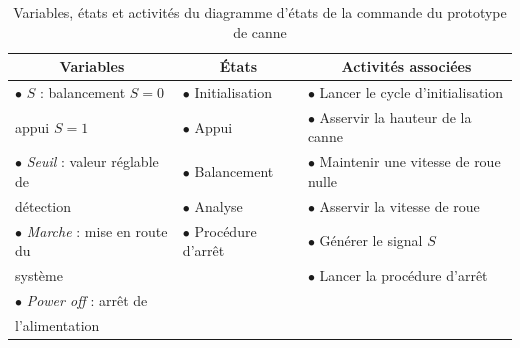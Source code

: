 \begin{table}[!ht]
\centering
 \begin{tabular}{|l|l|l|}
  \hline
  \multicolumn{1}{|c|}{\textbf{Variables}} & \multicolumn{1}{|c|}{\textbf{États}} & \multicolumn{1}{|c|}{\textbf{Activités associées}}  \\ 
  \hline
  $\bullet$ $S$ : balancement $S = 0$ & $\bullet$ Initialisation & $\bullet$ Lancer le cycle d'initialisation \\ 
  
  \hspace{0.8cm} appui $S = 1$ & $\bullet$ Appui & $\bullet$ Asservir la hauteur de la canne \\ 
  
  $\bullet$ {\it{Seuil}} : valeur réglable de & $\bullet$ Balancement & $\bullet$ Maintenir une vitesse de roue nulle \\ 
  
  \hspace{1.2cm} détection & $\bullet$ Analyse & $\bullet$ Asservir la vitesse de roue \\ 
  
  $\bullet$ {\it{Marche}} : mise en route du & $\bullet$ Procédure d'arrêt & $\bullet$ Générer le signal $S$ \\ 
  
  \hspace{1.5cm} système  &  &  $\bullet$ Lancer la procédure d'arrêt \\ 
  
 $\bullet$  {\it{Power off}} : arrêt de  &  &  \\ 
  
  \hspace{1.8cm} l'alimentation &  &  \\
    
  \hline  
\end{tabular}
\caption{{ Variables, états et activités du diagramme d'états de la commande du prototype de canne}}
\label{tab:table_var_etat_activite}
\end{table}
\fi


